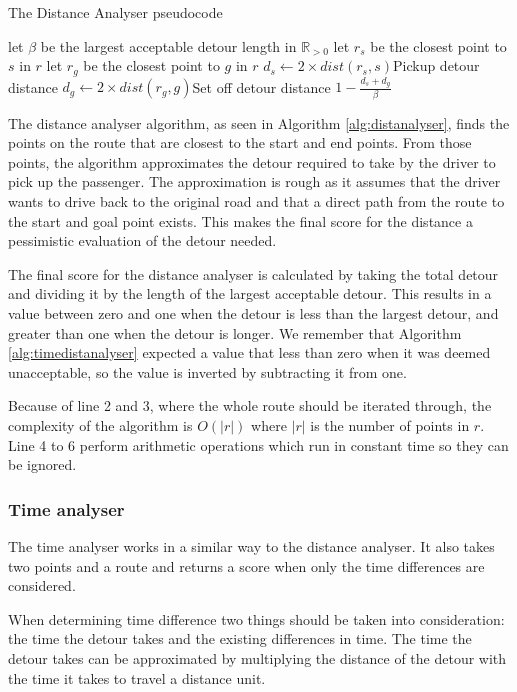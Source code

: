 \begin{algorithm}
	\caption{The Distance Analyser pseudocode}
	\label{alg:distanalyser}
	\begin{algorithmic}[1]
		\Require 
		\Statex let $\beta$ be the largest acceptable detour length in $\mathbb{R}_{>0}$ 
		\Statex 
			\State let $r_s$ be the closest point to $s$ in $r$
			\State let $r_g$ be the closest point to $g$ in $r$
			\State $d_s\gets 2\times dist(r_s, s)$\Comment Pickup detour distance
			\State $d_g\gets 2\times dist(r_g, g)$\Comment Set off detour distance
			\State\Return $1-\frac{d_s + d_g}{\beta}$
		\EndFunction
	\end{algorithmic}
\end{algorithm}

The distance analyser algorithm, as seen in Algorithm \ref{alg:distanalyser}, finds the points on the route that are closest to the start and end points.
From those points, the algorithm approximates the detour required to take by the driver to pick up the passenger.
The approximation is rough as it assumes that the driver wants to drive back to the original road and that a direct path from the route to the start and goal point exists.
This makes the final score for the distance a pessimistic evaluation  of the detour needed.

The final score for the distance analyser is calculated by taking the total detour and dividing it by the length of the largest acceptable detour.
This results in a value between zero and one when the detour is less than the largest detour, and greater than one when the detour is longer.
We remember that Algorithm \ref{alg:timedistanalyser} expected a value that less than zero when it was deemed unacceptable, so the value is inverted by subtracting it from one.

Because of line 2 and 3, where the whole route should be iterated through, the complexity of the algorithm is $O(|r|)$ where $|r|$ is the number of points in $r$.
Line 4 to 6 perform arithmetic operations which run in constant time so they can be ignored.

\subsubsection{Time analyser}
The time analyser works in a similar way to the distance analyser. 
It also takes two points and a route and returns a score when only the time differences are considered.

When determining time difference two things should be taken into consideration: the time the detour takes and the existing differences in time.
The time the detour takes can be approximated by multiplying the distance of the detour with the time it takes to travel a distance unit.


